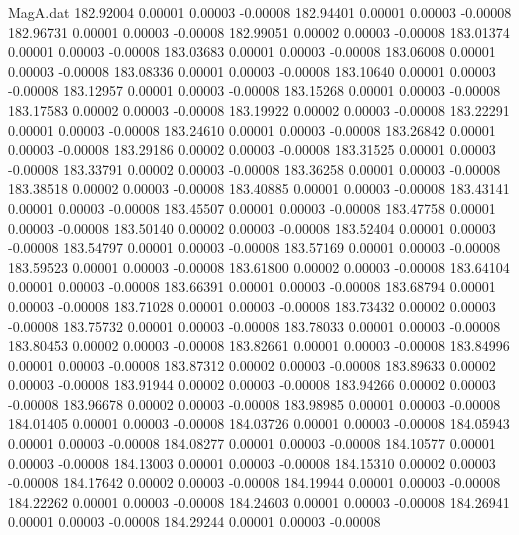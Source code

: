 \begin{filecontents}{MagA.dat}
 182.92004    0.00001    0.00003   -0.00008
 182.94401    0.00001    0.00003   -0.00008
 182.96731    0.00001    0.00003   -0.00008
 182.99051    0.00002    0.00003   -0.00008
 183.01374    0.00001    0.00003   -0.00008
 183.03683    0.00001    0.00003   -0.00008
 183.06008    0.00001    0.00003   -0.00008
 183.08336    0.00001    0.00003   -0.00008
 183.10640    0.00001    0.00003   -0.00008
 183.12957    0.00001    0.00003   -0.00008
 183.15268    0.00001    0.00003   -0.00008
 183.17583    0.00002    0.00003   -0.00008
 183.19922    0.00002    0.00003   -0.00008
 183.22291    0.00001    0.00003   -0.00008
 183.24610    0.00001    0.00003   -0.00008
 183.26842    0.00001    0.00003   -0.00008
 183.29186    0.00002    0.00003   -0.00008
 183.31525    0.00001    0.00003   -0.00008
 183.33791    0.00002    0.00003   -0.00008
 183.36258    0.00001    0.00003   -0.00008
 183.38518    0.00002    0.00003   -0.00008
 183.40885    0.00001    0.00003   -0.00008
 183.43141    0.00001    0.00003   -0.00008
 183.45507    0.00001    0.00003   -0.00008
 183.47758    0.00001    0.00003   -0.00008
 183.50140    0.00002    0.00003   -0.00008
 183.52404    0.00001    0.00003   -0.00008
 183.54797    0.00001    0.00003   -0.00008
 183.57169    0.00001    0.00003   -0.00008
 183.59523    0.00001    0.00003   -0.00008
 183.61800    0.00002    0.00003   -0.00008
 183.64104    0.00001    0.00003   -0.00008
 183.66391    0.00001    0.00003   -0.00008
 183.68794    0.00001    0.00003   -0.00008
 183.71028    0.00001    0.00003   -0.00008
 183.73432    0.00002    0.00003   -0.00008
 183.75732    0.00001    0.00003   -0.00008
 183.78033    0.00001    0.00003   -0.00008
 183.80453    0.00002    0.00003   -0.00008
 183.82661    0.00001    0.00003   -0.00008
 183.84996    0.00001    0.00003   -0.00008
 183.87312    0.00002    0.00003   -0.00008
 183.89633    0.00002    0.00003   -0.00008
 183.91944    0.00002    0.00003   -0.00008
 183.94266    0.00002    0.00003   -0.00008
 183.96678    0.00002    0.00003   -0.00008
 183.98985    0.00001    0.00003   -0.00008
 184.01405    0.00001    0.00003   -0.00008
 184.03726    0.00001    0.00003   -0.00008
 184.05943    0.00001    0.00003   -0.00008
 184.08277    0.00001    0.00003   -0.00008
 184.10577    0.00001    0.00003   -0.00008
 184.13003    0.00001    0.00003   -0.00008
 184.15310    0.00002    0.00003   -0.00008
 184.17642    0.00002    0.00003   -0.00008
 184.19944    0.00001    0.00003   -0.00008
 184.22262    0.00001    0.00003   -0.00008
 184.24603    0.00001    0.00003   -0.00008
 184.26941    0.00001    0.00003   -0.00008
 184.29244    0.00001    0.00003   -0.00008

\end{filecontents}
